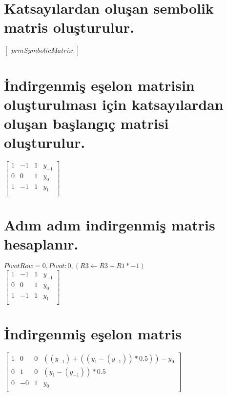 \documentclass{article}
\begin{document}
\section{Katsayılardan oluşan sembolik matris oluşturulur.}
\begin{center}
$\begin{bmatrix}
prmSymbolicMatrix
\end{bmatrix} $
\end{center}

\section{İndirgenmiş eşelon matrisin oluşturulması için katsayılardan oluşan başlangıç matrisi oluşturulur.}
\begin{center}
$\begin{bmatrix}
1&-1&1&y_{-1}\\
0&0&1&y_{0}\\
1&-1&1&y_{1}\\
\end{bmatrix} $
\end{center}

\section{Adım adım indirgenmiş matris hesaplanır.}
\begin{center}
$PivotRow= 0, Pivot: 0, (R3 \leftarrow R3 + R1 * -1) $\\
$\begin{bmatrix}
1&-1&1&y_{-1}\\
0&0&1&y_{0}\\
1&-1&1&y_{1}\\
\end{bmatrix} $
\end{center}

\section{İndirgenmiş eşelon matris}
\begin{center}
$\begin{bmatrix}
1&0&0&((y_{-1}) + ((y_{1} - (y_{-1})) * 0.5)) - y_{0}\\
0&1&0&(y_{1} - (y_{-1})) * 0.5\\
0&-0&1&y_{0}\\
\end{bmatrix} $
\end{center}
\end{document}
